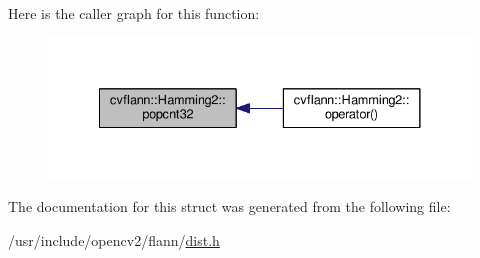 Here is the caller graph for this function\-:\nopagebreak
\begin{figure}[H]
\begin{center}
\leavevmode
\includegraphics[width=332pt]{structcvflann_1_1Hamming2_a6c4830cc73eb8cfa0bcbe0c244456c44_icgraph}
\end{center}
\end{figure}




The documentation for this struct was generated from the following file\-:\begin{DoxyCompactItemize}
\item 
/usr/include/opencv2/flann/\hyperlink{dist_8h}{dist.\-h}\end{DoxyCompactItemize}

